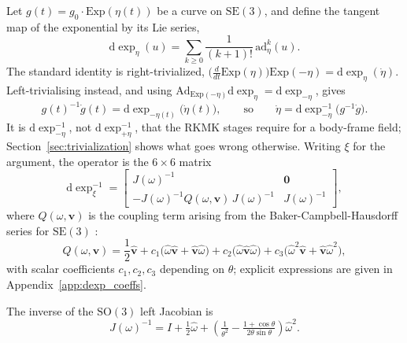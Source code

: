 \documentclass[a4paper,10pt]{article}
\newcommand{\SO}{\mathrm{SO}(3)}
\newcommand{\SE}{\mathrm{SE}(3)}
\newcommand{\Exp}{\mathrm{Exp}}
\newcommand{\dexp}{\mathrm{d}\exp}
\newcommand{\Ad}{\mathrm{Ad}}
\newcommand{\ad}{\mathrm{ad}}
\newcommand{\skw}[1]{\widehat{#1}}
\theoremstyle{definition}
\begin{document}
Let $g(t) = g_0 \cdot \Exp(\eta(t))$ be a curve on $\SE$, and define the
tangent map of the exponential by its Lie series,
\begin{equation}
  \dexp_\eta(u) = \sum_{k \geq 0} \frac{1}{(k+1)!}\,\ad^k_\eta(u).
  \label{eq:dexp_series}
\end{equation}
The standard identity is right-trivialized,
$\bigl(\tfrac{d}{dt}\Exp(\eta)\bigr)\Exp(-\eta) = \dexp_\eta(\dot\eta)$.
Left-trivialising instead, and using
$\Ad_{\Exp(-\eta)}\dexp_\eta = \dexp_{-\eta}$, gives
\begin{equation}
  g(t)^{-1}\dot{g}(t) = \dexp_{-\eta(t)}\bigl(\dot{\eta}(t)\bigr),
  \qquad\text{so}\qquad
  \dot\eta = \dexp^{-1}_{-\eta}\bigl(g^{-1}\dot g\bigr).
  \label{eq:left_triv}
\end{equation}
It is $\dexp^{-1}_{-\eta}$, not $\dexp^{-1}_{+\eta}$, that the RKMK stages
require for a body-frame field; Section~\ref{sec:trivialization} shows what
goes wrong otherwise.  Writing $\xi$ for the argument, the operator is the
$6\times 6$ matrix
\begin{equation}
  \dexp^{-1}_\xi =
  \begin{bmatrix}
    J(\omega)^{-1}   & \mathbf{0} \\
    -J(\omega)^{-1} Q(\omega,\mathbf{v})\, J(\omega)^{-1} & J(\omega)^{-1}
  \end{bmatrix},
  \label{eq:dexp_inv}
\end{equation}
where $Q(\omega,\mathbf{v})$ is the coupling term arising from the
Baker-Campbell-Hausdorff series for $\SE$
\citep{barfoot2017stateEstimation,hairerLubichWanner2006gni}:
\begin{equation}
  Q(\omega, \mathbf{v}) =
    \frac{1}{2}\skw{\mathbf{v}}
    + c_1 \bigl(\skw{\omega}\skw{\mathbf{v}} + \skw{\mathbf{v}}\skw{\omega}\bigr)
    + c_2 \bigl(\skw{\omega}\skw{\mathbf{v}}\skw{\omega}\bigr)
    + c_3 \bigl(\skw{\omega}^2\skw{\mathbf{v}} + \skw{\mathbf{v}}\skw{\omega}^2\bigr),
  \label{eq:Q_term}
\end{equation}
with scalar coefficients $c_1,c_2,c_3$ depending on $\theta$; explicit
expressions are given in Appendix~\ref{app:dexp_coeffs}.

The inverse of the $\SO$ left Jacobian is
\begin{equation}
  J(\omega)^{-1} = I + \tfrac{1}{2}\skw{\omega}
    + \left(\tfrac{1}{\theta^2} - \tfrac{1+\cos\theta}{2\theta\sin\theta}\right)
      \skw{\omega}^2.
  \label{eq:so3_left_jac_inv}
\end{equation}
\end{document}

